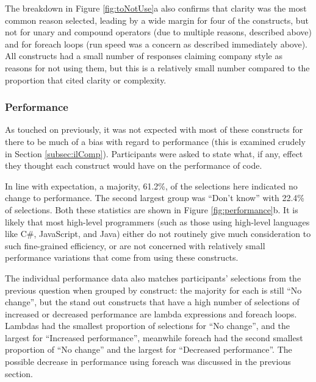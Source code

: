 \documentclass{article}
\begin{document}
            The breakdown in Figure \ref{fig:toNotUse}a also confirms that clarity was the most common reason selected, leading by a wide margin for four of the constructs, but not for unary and compound operators (due to multiple reasons, described above) and for foreach loops (run speed was a concern as described immediately above).
            All constructs had a small number of responses claiming company style as reasons for not using them, but this is a relatively small number compared to the proportion that cited clarity or complexity.

        \subsubsection{Performance}
            As touched on previously, it was not expected with most of these constructs for there to be much of a bias with regard to performance (this is examined crudely in Section \ref{subsec:ilComp}). Participants were asked to state what, if any, effect they thought each construct would have on the performance of code.
            \newline

            In line with expectation, a majority, 61.2\%, of the selections here indicated no change to performance. The second largest group was ``Don't know'' with 22.4\% of selections. Both these statistics are shown in Figure \ref{fig:performance}b. It is likely that most high-level programmers (such as those using high-level languages like C\#, JavaScript, and Java) either do not routinely give much consideration to such fine-grained efficiency, or are not concerned with relatively small performance variations that come from using these constructs.

            The individual performance data also matches participants' selections from the previous question when grouped by construct: the majority for each is still ``No change'', but the stand out constructs that have a high number of selections of increased or decreased performance are lambda expressions and foreach loops. Lambdas had the smallest proportion of selections for ``No change'', and the largest for ``Increased performance'', meanwhile foreach had the second smallest proportion of ``No change'' and the largest for ``Decreased performance''. The possible decrease in performance using foreach was discussed in the previous section.
\end{document}
